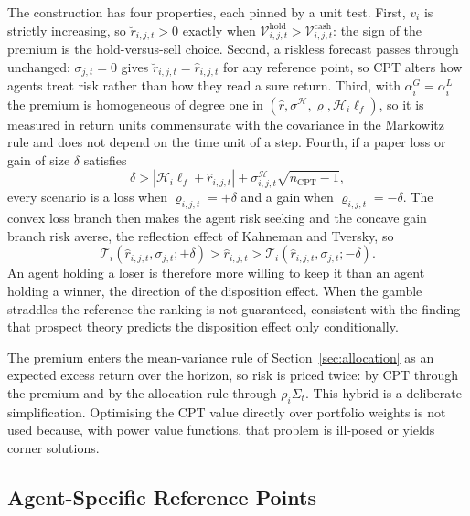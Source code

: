\documentclass[12pt, a4paper]{article}
\begin{document}
    The construction has four properties, each pinned by a unit test. First,
    \(v_i\) is strictly increasing, so \(\breve r_{i,j,t}>0\) exactly when
    \(\mathcal{V}_{i,j,t}^{\mathrm{hold}}>\mathcal{V}_{i,j,t}^{\mathrm{cash}}\):
    the sign of the premium is the hold-versus-sell choice. Second, a riskless
    forecast passes through unchanged: \(\sigma_{j,t}=0\) gives
    \(\breve r_{i,j,t}=\hat r_{i,j,t}\) for any reference point, so CPT alters how
    agents treat risk rather than how they read a sure return. Third, with
    \(\alpha_i^G=\alpha_i^L\) the premium is homogeneous of degree one in
    \((\hat r,\sigma^{\mathcal H},\varrho,\mathcal H_i\ell_f)\), so it is measured
    in return units commensurate with the covariance in the Markowitz rule and
    does not depend on the time unit of a step. Fourth, if a paper loss or gain of
    size \(\delta\) satisfies
    \[
        \delta>|\mathcal H_i\ell_f+\hat r_{i,j,t}|+\sigma_{i,j,t}^{\mathcal H}\sqrt{n_{\mathrm{CPT}}-1},
    \]
    every scenario is a loss when \(\varrho_{i,j,t}=+\delta\) and a gain when
    \(\varrho_{i,j,t}=-\delta\). The convex loss branch then makes the agent risk
    seeking and the concave gain branch risk averse, the reflection effect of
    Kahneman and Tversky, so
    \[
        \mathcal{T}_i(\hat r_{i,j,t},\sigma_{j,t};+\delta)
        >\hat r_{i,j,t}>
        \mathcal{T}_i(\hat r_{i,j,t},\sigma_{j,t};-\delta).
    \]
    An agent holding a loser is therefore more willing to keep it than an agent
    holding a winner, the direction of the disposition effect. When the gamble
    straddles the reference the ranking is not guaranteed, consistent with the
    finding that prospect theory predicts the disposition effect only
    conditionally.

    The premium enters the mean-variance rule of Section~\ref{sec:allocation} as
    an expected excess return over the horizon, so risk is priced twice: by CPT
    through the premium and by the allocation rule through \(\rho_i\Sigma_t\).
    This hybrid is a deliberate simplification. Optimising the CPT value directly
    over portfolio weights is not used because, with power value functions, that
    problem is ill-posed or yields corner solutions.

    \subsection{Agent-Specific Reference Points}\label{sec:cpt_reference_points}
\end{document}
